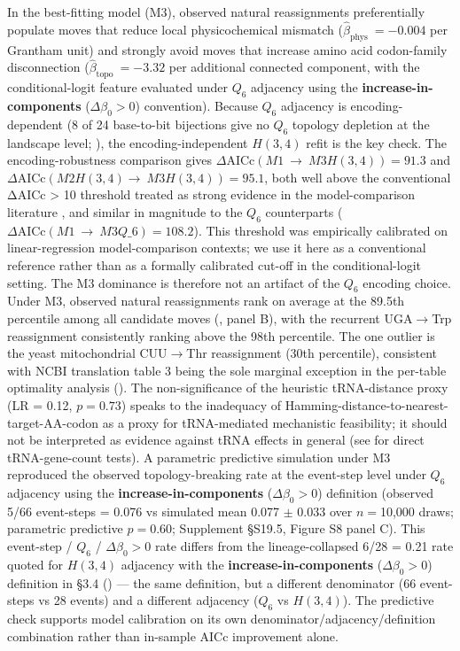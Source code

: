 \documentclass[preprint,11pt,authoryear,a4paper]{elsarticle}
\begin{document}
In the best-fitting model (M3), observed natural reassignments
preferentially populate moves that reduce local physicochemical mismatch
(\({\hat{\beta}}_{\text{phys }} = - 0.004\) per Grantham unit) and
strongly avoid moves that increase amino acid codon-family disconnection
(\({\hat{\beta}}_{\text{topo }} = - 3.32\) per additional connected
component, with the conditional-logit feature evaluated under \(Q_{6}\)
adjacency using the \textbf{increase-in-components}
(\(\Delta\beta_{0} > 0\)) convention). Because \(Q_{6}\) adjacency is
encoding-dependent (8 of 24 base-to-bit bijections give no \(Q_{6}\)
topology depletion at the landscape level; ), the
encoding-independent \(H(3,4)\) refit is the key check. The
encoding-robustness comparison gives
\(\Delta\text{AICc}\left( M1\  \rightarrow \ M3{H(3,4)} \right) = 91.3\)
and
\(\Delta\text{AICc}\left( M2{H(3,4)} \rightarrow \ M3{H(3,4)} \right) = 95.1\),
both well above the conventional ΔAICc \textgreater{} 10 threshold
treated as strong evidence in the model-comparison literature
\citep{burnham2002}, and similar in magnitude to the \(Q_{6}\)
counterparts
(\(\Delta\text{AICc}(M1\  \rightarrow \ M3Q\_ 6) = 108.2\)). This
threshold was empirically calibrated on linear-regression
model-comparison contexts; we use it here as a conventional reference
rather than as a formally calibrated cut-off in the conditional-logit
setting. The M3 dominance is therefore not an artifact of the \(Q_{6}\)
encoding choice. Under M3, observed natural reassignments rank on
average at the 89.5th percentile among all candidate moves
(, panel B), with the recurrent
UGA\(\rightarrow\)Trp reassignment consistently ranking above the 98th
percentile. The one outlier is the yeast mitochondrial
CUU\(\rightarrow\)Thr reassignment (30th percentile), consistent with
NCBI translation table 3 being the sole marginal exception in the
per-table optimality analysis (). The
non-significance of the heuristic tRNA-distance proxy (LR = 0.12,
\(p = 0.73\)) speaks to the inadequacy of
Hamming-distance-to-nearest-target-AA-codon as a proxy for tRNA-mediated
mechanistic feasibility; it should not be interpreted as evidence
against tRNA effects in general (see  for direct
tRNA-gene-count tests). A parametric predictive simulation under M3
reproduced the observed topology-breaking rate at the event-step level
under \(Q_{6}\) adjacency using the \textbf{increase-in-components}
(\(\Delta\beta_{0} > 0\)) definition (observed 5/66 event-steps = 0.076
vs simulated mean 0.077 \(\pm\) 0.033 over \(n =\)10,000 draws;
parametric predictive \(p = 0.60\); Supplement §S19.5, Figure S8 panel
C). This event-step / \(Q_{6}\) / \(\Delta\beta_{0} > 0\) rate differs
from the lineage-collapsed 6/28 = 0.21 rate quoted for \(H(3,4)\)
adjacency with the \textbf{increase-in-components}
(\(\Delta\beta_{0} > 0\)) definition in §3.4 () ---
the same definition, but a different denominator (66 event-steps vs 28
events) and a different adjacency (\(Q_{6}\) vs \(H(3,4)\)). The
predictive check supports model calibration on its own
denominator/adjacency/definition combination rather than in-sample AICc
improvement alone.
\end{document}
